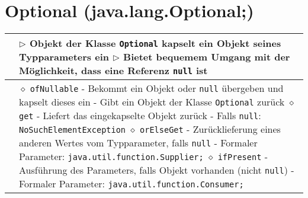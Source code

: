 \begin{tabular}{ | p{} p{} | }
	\end{tabular}

\section{Optional (java.lang.Optional;)}
	\begin{tabular}{ | p{} p{} | }
	\hline
	
	\makecell[l]{Informationen} & \makecell[l]{
	$\triangleright$ Objekt der Klasse \texttt{Optional} kapselt ein Objekt seines Typparameters ein \\
	$\triangleright$ Bietet bequemem Umgang mit der Möglichkeit, dass eine Referenz \texttt{null} ist } \\ \hline

	\makecell[l]{Methoden} & \makecell[l]{
	\hspace{0.4cm} $\diamond$ \texttt{ofNullable} \\
	\hspace{0.6cm} - Bekommt ein Objekt oder \texttt{null} übergeben und kapselt dieses ein \\
	\hspace{0.6cm} - Gibt ein Objekt der Klasse \texttt{Optional} zurück \\
	\hspace{0.4cm} $\diamond$ \texttt{get} \\
	\hspace{0.6cm} - Liefert das eingekapselte Objekt zurück \\
	\hspace{0.6cm} - Falls \texttt{null}: \texttt{NoSuchElementException} \\
	\hspace{0.4cm} $\diamond$ \texttt{orElseGet} \\
	\hspace{0.6cm} - Zurücklieferung eines anderen Wertes vom Typparameter, falls \texttt{null} \\
	\hspace{0.6cm} - Formaler Parameter: \texttt{java.util.function.Supplier;} \\
	\hspace{0.4cm} $\diamond$ \texttt{ifPresent} \\
	\hspace{0.6cm} - Ausführung des Parameters, falls Objekt vorhanden (nicht \texttt{null}) \\
	\hspace{0.6cm} - Formaler Parameter: \texttt{java.util.function.Consumer;} \\
}
\end{tabular}
